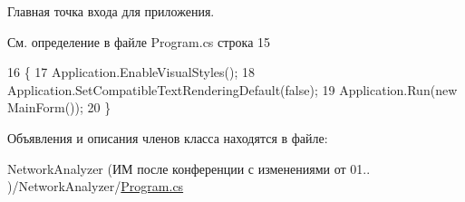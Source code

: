 Главная точка входа для приложения. 



См. определение в файле Program.\+cs строка 15


\begin{DoxyCode}
16         \{
17             Application.EnableVisualStyles();
18             Application.SetCompatibleTextRenderingDefault(\textcolor{keyword}{false});
19             Application.Run(\textcolor{keyword}{new} MainForm());
20         \}
\end{DoxyCode}


Объявления и описания членов класса находятся в файле\+:\begin{DoxyCompactItemize}
\item 
Network\+Analyzer (ИМ после конференции  с изменениями от 01.. )/\+Network\+Analyzer/\hyperlink{_network_analyzer_2_program_8cs}{Program.\+cs}\end{DoxyCompactItemize}
